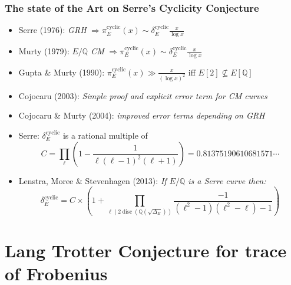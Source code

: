 \documentclass[10pt,handout]{beamer} %
\newcommand{\Q}{\mathbb Q}
\theoremstyle{definition}
\begin{document}
\begin{frame}
\frametitle{The state of the Art on Serre's Cyclicity Conjecture}

\begin{itemize}[<+-| alert@+>]
\item Serre (1976): \emph{GRH }$\Rightarrow \pi_E^{\text{cyclic}}(x)\sim \delta_E^{\text{cyclic}}\frac{x}{\log x}$
\item Murty (1979): \emph{$E/\Q$ CM} $\Rightarrow \pi_E^{\text{cyclic}}(x)\sim \delta_E^{\text{cyclic}}\frac{x}{\log x}$
\item Gupta \& Murty (1990): $\pi_E^{\text{cyclic}}(x)\gg\frac{x}{(\log x)^2}$ iff $E[2]\nsubseteq E[\Q]$
 \item Cojocaru (2003): \emph{Simple proof and explicit error term for CM curves}
 \item Cojocaru \& Murty (2004): \emph{improved error terms depending on GRH}
 \item Serre: $\delta_E^{\text{cyclic}}$ is a rational multiple of 
 $$C=\prod_\ell\left(
 1-\frac1{\ell(\ell-1)^2(\ell+1)}\right)= 0.81375190610681571\cdots$$
 \item Lenstra, Moree \& Stevenhagen (2013): \emph{If $E/\Q$ is a Serre curve then:}
$$\delta_E^{\text{cyclic}}=
C\times\left(1+\prod_{\ell\mid 2\operatorname{disc}(\Q(\sqrt{\Delta_E}))}\frac{-1}{(\ell^2-1)(\ell^2-\ell)-1}\right)$$
 \end{itemize}\pause
\end{frame}


\section{Lang Trotter Conjecture for trace of Frobenius}
\end{document}
